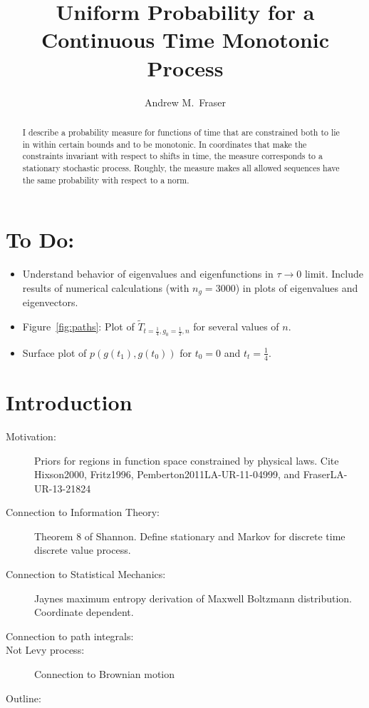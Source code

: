 \documentclass[12pt]{article} \usepackage{amsmath,amsfonts}
\title{Uniform Probability for a Continuous Time Monotonic Process }
\author{Andrew M.\ Fraser}
\begin{document}
\maketitle
\begin{abstract}
  I describe a probability measure for functions of time that are
  constrained both to lie in within certain bounds and to be
  monotonic.  In coordinates that make the constraints invariant with
  respect to shifts in time, the measure corresponds to a stationary
  stochastic process.  Roughly, the measure makes all allowed
  sequences have the same probability %
  with respect to a norm.
\end{abstract}

\section*{To Do:}
\label{sec:do}

\begin{itemize}
\item Understand behavior of eigenvalues and eigenfunctions in
  $\tau \rightarrow 0$ limit.  Include results of numerical
  calculations (with $n_g=3000$) in plots of eigenvalues and
  eigenvectors.
\item Figure~\ref{fig:paths}: Plot of
  $\tilde T_{t=\frac{1}{4},g_0=\frac{1}{2},n}$ for several values of
  $n$.
\item Surface plot of $p(g(t_1),g(t_0))$ for $t_0=0$ and
  $t_t=\frac{1}{4}$.
\end{itemize}

\section{Introduction}
\label{sec:introduction}
\begin{description}
\item[Motivation:] Priors for regions in function space constrained by
  physical laws.  Cite Hixson2000, Fritz1996,
  Pemberton2011LA-UR-11-04999, and FraserLA-UR-13-21824
\item[Connection to Information Theory:] Theorem 8 of Shannon.  Define
  stationary and Markov for discrete time discrete value process.
\item[Connection to Statistical Mechanics:] Jaynes maximum entropy
  derivation of Maxwell Boltzmann distribution.  Coordinate dependent.
\item[Connection to path integrals:]
\item[Not Levy process:] Connection to Brownian motion
\item[Outline:]
\end{description}
\end{document}
